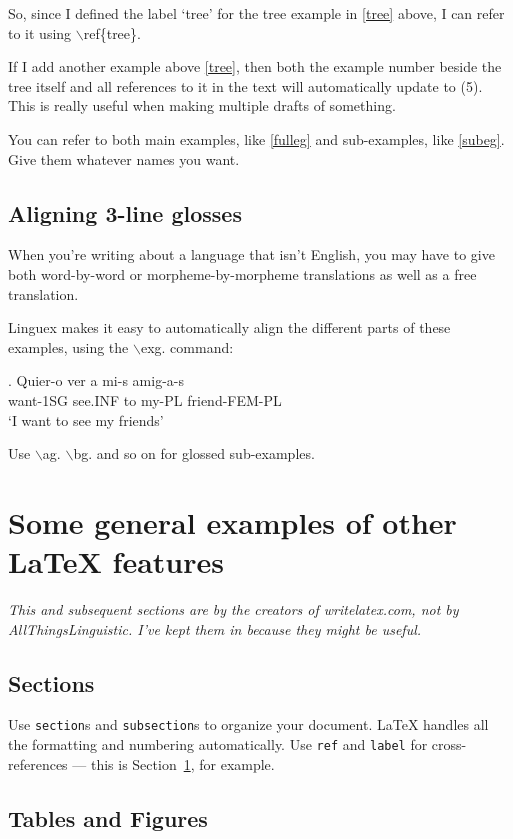 \documentclass[12pt]{article}
\begin{document}
So, since I defined the label `tree' for the tree example in \ref{tree} above, I can refer to it using $\backslash$ref\{tree\}. 

If I add another example above \ref{tree}, then both the example number beside the tree itself and all references to it in the text will automatically update to (5). This is really useful when making multiple drafts of something.

You can refer to both main examples, like \ref{fulleg} and sub-examples, like \ref{subeg}. Give them whatever names you want. 

\subsection{Aligning 3-line glosses}

When you're writing about a language that isn't English, you may have to give both word-by-word or morpheme-by-morpheme translations as well as a free translation. 

Linguex makes it easy to automatically align the different parts of these examples, using the $\backslash$exg. command: 

\exg. Quier-o ver a mi-s amig-a-s\\
want-1SG see.INF to my-PL friend-FEM-PL\\
`I want to see my friends'

Use $\backslash$ag. $\backslash$bg. and so on for glossed sub-examples.

\section{Some general examples of other \LaTeX{} features}
\label{sec:examples}

{\it This and subsequent sections are by the creators of writelatex.com, not by AllThingsLinguistic. I've kept them in because they might be useful.}

\subsection{Sections}

Use \texttt{section}s and \texttt{subsection}s to organize your document. \LaTeX{} handles all the formatting and numbering automatically. Use \texttt{ref} and \texttt{label} for cross-references --- this is Section~\ref{sec:examples}, for example.

\subsection{Tables and Figures}
\end{document}
